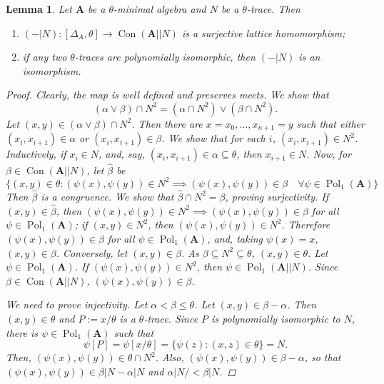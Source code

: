 \documentclass{amsart}
\theoremstyle{plain}
\newtheorem{lemma}[theorem]{Lemma}
\theoremstyle{definition}
\theoremstyle{remark}
\def\A{\forall}
\DeclareMathOperator{\Con}{Con}
\DeclareMathOperator{\Pol}{Pol}
\begin{document}
\begin{lemma}
    \label{lemma_relative}
    Let $\mathbf{A}$ be a $\theta$-minimal algebra and $N$ be a $\theta$-trace. 
    Then 
    \begin{enumerate}
        \item $(-|N): [\Delta_A, \theta] \to \Con(\mathbf{A}||N)$ is a surjective lattice homomorphism; 
        \item if any two $\theta$-traces are polynomially isomorphic, then $(-|N)$ is an isomorphism. 
    \end{enumerate}
    \begin{proof}
        Clearly, the map is well defined and preserves meets. 
        We show that 
        \begin{equation*}
            (\alpha \lor \beta) \cap N^2 = (\alpha \cap N^2) \lor (\beta \cap N^2) \text{.}
        \end{equation*}
        Let $(x,y) \in (\alpha \lor \beta) \cap N^2$. 
        Then there are $x=x_0, \ldots, x_{n+1}=y$ such that either $(x_i,x_{i+1}) \in \alpha$ or $(x_i,x_{i+1}) \in \beta$. 
        We show that for each $i$, $(x_i, x_{i+1}) \in N^2$. 
        Inductively, if $x_i \in N$, and, say, $(x_i, x_{i+1}) \in \alpha \subseteq \theta$, then $x_{i+1} \in N$. 
        Now, for $\beta \in \Con(\mathbf{A}||N)$, let $\hat{\beta}$ be
        \begin{equation*}
            \{(x,y) \in \theta : (\psi(x), \psi(y)) \in N^2 \implies (\psi(x), \psi(y)) \in \beta \quad \A \psi \in \Pol_1(\mathbf{A}) \}
        \end{equation*}
        Then $\hat{\beta}$ is a congruence. 
        We show that $\hat{\beta} \cap N^2 =\beta$, proving surjectivity. 
        If $(x,y) \in \hat{\beta}$, then $(\psi(x), \psi(y)) \in N^2 \implies (\psi(x), \psi(y)) \in \beta$ for all $\psi \in \Pol_1(\mathbf{A})$; 
        if $(x,y) \in N^2$, then $(\psi(x), \psi(y)) \in N^2$. 
        Therefore $(\psi(x), \psi(y)) \in \beta$ for all $\psi \in \Pol_1(\mathbf{A})$, and, taking $\psi(x)=x$, $(x,y) \in \beta$. 
        Conversely, let $(x,y) \in \beta$. As $\beta \subseteq N^2 \subseteq \theta$, $(x,y) \in \theta$. 
        Let $\psi \in \Pol_1(\mathbf{A})$. 
        If $(\psi(x), \psi(y)) \in N^2$, then $\psi \in \Pol_1(\mathbf{A}||N)$. 
        Since $\beta \in \Con(\mathbf{A}||N)$, $ (\psi(x), \psi(y)) \in \beta$.  

        We need to prove injectivity. 
        Let $\alpha < \beta \le \theta$. 
        Let $(x,y) \in \beta - \alpha$. 
        Then $(x,y) \in \theta$ and $P:=x/\theta$ is a $\theta$-trace. 
        Since $P$ is polynomially isomorphic to $N$, there is $\psi \in \Pol_1(\mathbf{A})$ such that 
        \begin{equation*}
            \psi[P] = \psi[x/\theta] =\{\psi(z): (x,z) \in \theta\}= N \text{.}
        \end{equation*}
        Then, $(\psi(x),\psi(y)) \in \theta \cap N^2$.
        Also, $(\psi(x),\psi(y)) \in \beta - \alpha$, so that $(\psi(x),\psi(y)) \in \beta|N - \alpha|N$ and $\alpha|N/< \beta|N$. 
    \end{proof}
\end{lemma}
\end{document}
